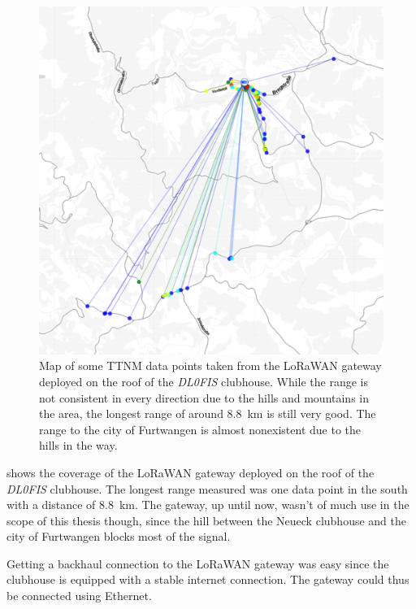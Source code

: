 \begin{figure}[htbp]
    \centering
    \includegraphics[width=1\textwidth]{pictures/ttn-mapper/gateway-ranges/dl0fis_gw_range.jpg}
    \caption{
        Map of some \ac{TTNM} data points taken from the \ac{LoRaWAN} gateway deployed on the roof of the \emph{DL0FIS} clubhouse.
        While the range is not consistent in every direction due to the hills and mountains in the area, the longest range of around \SI{8.8}{\kilo\meter} is still very good.
        The range to the city of Furtwangen is almost nonexistent due to the hills in the way.
    }\label{pic:dl0fis_gw_range}
\end{figure}

 shows the coverage of the \ac{LoRaWAN} gateway deployed on the roof of the \emph{DL0FIS} clubhouse.
The longest range measured was one data point in the south with a distance of \SI{8.8}{\kilo\meter}.
The gateway, up until now, wasn't of much use in the scope of this thesis though, since the hill between the Neueck clubhouse and the city of Furtwangen blocks most of the signal.

Getting a backhaul connection to the \ac{LoRaWAN} gateway was easy since the clubhouse is equipped with a stable internet connection.
The gateway could thus be connected using Ethernet.

